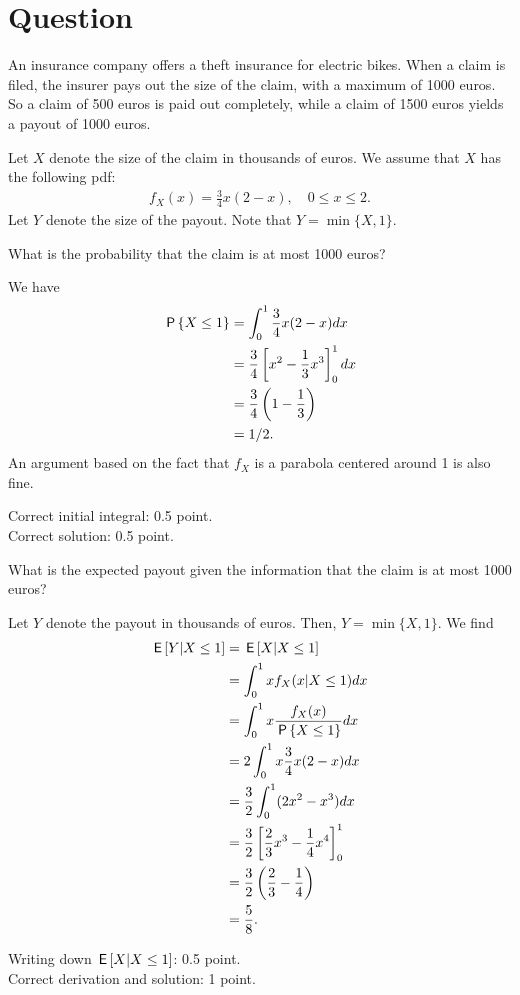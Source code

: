 \section{Question}


An insurance company offers a theft insurance for electric bikes. When a claim is filed, the insurer pays out the size of the claim, with a maximum of 1000 euros. So a claim of 500 euros is paid out completely, while a claim of 1500 euros yields a payout of 1000 euros.

Let $X$ denote the size of the claim in thousands of euros. We assume that $X$ has the following pdf:
\begin{align}
    f_X(x) = \frac{3}{4}x(2-x), \quad 0 \leq x \leq 2.
\end{align}
Let $Y$ denote the size of the payout. Note that $Y = \min\{X,1\}$.

\begin{exercise}[1]
What is the probability that the claim is at most 1000 euros?
\begin{solution}
We have
\begin{align}
    \P{X \leq 1} &= \int_0^1 \frac{3}{4} x (2-x) dx \\
    &=  \frac{3}{4}\left[ x^2 - \frac{1}{3} x^3 \right]_0^1 dx \\
    &=  \frac{3}{4}\left( 1 - \frac{1}{3} \right) \\
    &= 1/2.
\end{align}
An argument based on the fact that $f_X$ is a parabola centered around 1 is also fine.

Correct initial integral: 0.5 point.\\
Correct solution: 0.5 point.
\end{solution}
\end{exercise}

\begin{exercise}[1.5]
What is the expected payout given the information that the claim is at most 1000 euros?
\begin{solution}
Let $Y$ denote the payout in thousands of euros. Then, $Y = \min\{X,1\}$. We find
\begin{align}
    \E{Y|X\leq 1} &= \E{X|X\leq 1} \\
    &= \int_0^1 x f_X(x|X\leq 1) dx \\
    &= \int_0^1 x \frac{f_X(x)}{\P{X \leq 1}} dx \\
    &= 2 \int_0^1 x \frac{3}{4} x (2-x)  dx \\
    &= \frac{3}{2} \int_0^1 (2x^2 - x^3)  dx \\
    &= \frac{3}{2} \left[ \frac{2}{3} x^3 - \frac{1}{4} x^4\right]_0^1 \\
    &= \frac{3}{2} \left( \frac{2}{3} - \frac{1}{4} \right) \\
    &= \frac{5}{8}.
\end{align}

Writing down $\E{X|X\leq 1}$: 0.5 point.\\
Correct derivation and solution: 1 point.
\end{solution}
\end{exercise}

